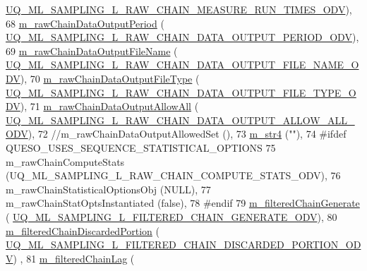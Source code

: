 \begin{DoxyCode}
      \hyperlink{_m_l_sampling_level_options_8h_a158a4398c61213ee5d3037ee8e81b350}{UQ\_ML\_SAMPLING\_L\_RAW\_CHAIN\_MEASURE\_RUN\_TIMES\_ODV}),
68   \hyperlink{class_q_u_e_s_o_1_1_m_l_sampling_level_options_a8fdb68e6d3e91f0334293f2ee009aded}{m\_rawChainDataOutputPeriod}                 (
      \hyperlink{_m_l_sampling_level_options_8h_ae1b20b0ef90421eccab6f39dcf7f2539}{UQ\_ML\_SAMPLING\_L\_RAW\_CHAIN\_DATA\_OUTPUT\_PERIOD\_ODV}),
69   \hyperlink{class_q_u_e_s_o_1_1_m_l_sampling_level_options_ab89d7ed301a956f913058a8e5f63fbbd}{m\_rawChainDataOutputFileName}               (
      \hyperlink{_m_l_sampling_level_options_8h_ae810d0fb59aa83e791d5d43f3fc01d83}{UQ\_ML\_SAMPLING\_L\_RAW\_CHAIN\_DATA\_OUTPUT\_FILE\_NAME\_ODV}),
70   \hyperlink{class_q_u_e_s_o_1_1_m_l_sampling_level_options_a239091edd94cfa694c6c33591c1d1ba2}{m\_rawChainDataOutputFileType}               (
      \hyperlink{_m_l_sampling_level_options_8h_a9184408abc4c6cc11328e3f71c5b8c29}{UQ\_ML\_SAMPLING\_L\_RAW\_CHAIN\_DATA\_OUTPUT\_FILE\_TYPE\_ODV}),
71   \hyperlink{class_q_u_e_s_o_1_1_m_l_sampling_level_options_a4e84fdd26bf87099d2b126f5fda379a6}{m\_rawChainDataOutputAllowAll}               (
      \hyperlink{_m_l_sampling_level_options_8h_abcacf13c7a6dd5e2d5ef8ec237164623}{UQ\_ML\_SAMPLING\_L\_RAW\_CHAIN\_DATA\_OUTPUT\_ALLOW\_ALL\_ODV}),
72 \textcolor{comment}{//m\_rawChainDataOutputAllowedSet             (),}
73   \hyperlink{class_q_u_e_s_o_1_1_m_l_sampling_level_options_a399d93049d7862d47c8ac68e1885d0c9}{m\_str4}                                     (\textcolor{stringliteral}{""}),
74 \textcolor{preprocessor}{#ifdef QUESO\_USES\_SEQUENCE\_STATISTICAL\_OPTIONS}
75 \textcolor{preprocessor}{}  m\_rawChainComputeStats                     (UQ\_ML\_SAMPLING\_L\_RAW\_CHAIN\_COMPUTE\_STATS\_ODV),
76   m\_rawChainStatisticalOptionsObj            (NULL),
77   m\_rawChainStatOptsInstantiated             (\textcolor{keyword}{false}),
78 \textcolor{preprocessor}{#endif}
79 \textcolor{preprocessor}{}  \hyperlink{class_q_u_e_s_o_1_1_m_l_sampling_level_options_a878542ef3504c843b50e0bd5efd0c078}{m\_filteredChainGenerate}                    (
      \hyperlink{_m_l_sampling_level_options_8h_a3afd5f4af4051329da3add2f4112c7ee}{UQ\_ML\_SAMPLING\_L\_FILTERED\_CHAIN\_GENERATE\_ODV}),
80   \hyperlink{class_q_u_e_s_o_1_1_m_l_sampling_level_options_a22220cb7fbdef58a009733f8cf1887f9}{m\_filteredChainDiscardedPortion}            (
      \hyperlink{_m_l_sampling_level_options_8h_a7474c3c7894e86c9994a086e7eb6c034}{UQ\_ML\_SAMPLING\_L\_FILTERED\_CHAIN\_DISCARDED\_PORTION\_ODV})
      ,
81   \hyperlink{class_q_u_e_s_o_1_1_m_l_sampling_level_options_a6740efa52d4f8ec112be817f5220cf94}{m\_filteredChainLag}                         (

\end{DoxyCode}
